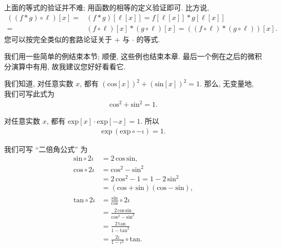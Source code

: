 上面的等式的验证并不难; 用函数的相等的定义验证即可. 比方说,
\begin{align*}
    ((f \ast g) \circ \ell)[x]
    = {} & (f \ast g)[\ell[x]] = f[\ell[x]] \ast g[\ell[x]] \\
    = {} & (f \circ \ell)[x] \ast (g \circ \ell)[x]
    = ((f \circ \ell) \ast (g \circ \ell))[x].
\end{align*}
您可以按完全类似的套路论证关于 $+$ 与 $\cdot$ 的等式.

我们用一些简单的例结束本节; 顺便, 这些例也结束本章. 最后一个例在之后的微积分演算中有用, 故我建议您好好看看它.

\begin{example}
    我们知道, 对任意实数 $x$, 都有 $(\mathrm{cos} {[x]})^2 + (\mathrm{sin} {[x]})^2 = 1$. 那么, 无变量地, 我们可写此式为
    \begin{align*}
        \mathrm{cos}^2 + \mathrm{sin}^2 = 1.
    \end{align*}
\end{example}

\begin{example}
    对任意实数 $x$, 都有 $\mathrm{exp} {[x]} \cdot \mathrm{exp} {[-x]} = 1$. 所以
    \begin{align*}
        \mathrm{exp} \, ({\mathrm{exp}} \circ {-\iota}) = 1.
    \end{align*}
\end{example}

\begin{example}
    我们可写 ``二倍角公式'' 为
    \begin{align*}
        \mathrm{sin} \circ {2\iota} & = 2 \,\mathrm{cos} \,\mathrm{sin},                                        \\
        \mathrm{cos} \circ {2\iota} & = \mathrm{cos}^2 - \mathrm{sin}^2                                         \\
                                    & = 2\,\mathrm{cos}^2 - 1 = 1 - 2\,\mathrm{sin}^2                           \\
                                    & = (\mathrm{cos} + \mathrm{sin})(\mathrm{cos} - \mathrm{sin}),             \\
        \mathrm{tan} \circ {2\iota} & = \frac{\mathrm{sin}}{\mathrm{cos}} \circ {2\iota}                        \\
                                    & = \frac{2 \,\mathrm{cos} \,\mathrm{sin}}{\mathrm{cos}^2 - \mathrm{sin}^2} \\
                                    & = \frac{2\,\mathrm{tan}}{1 - \mathrm{tan}^2}                              \\
                                    & = \frac{2\iota}{1 - \iota^2} \circ {\mathrm{tan}}.
    \end{align*}
\end{example}

